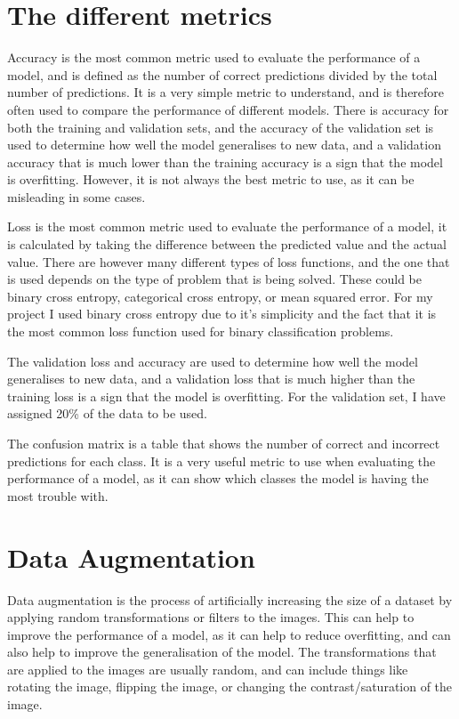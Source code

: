 \documentclass[]{final_report}
\begin{document}
\section{The different metrics}
Accuracy is the most common metric used to evaluate the performance of a model, and is defined as the number of correct predictions divided by the total number of predictions.
It is a very simple metric to understand, and is therefore often used to compare the performance of different models.
There is accuracy for both the training and validation sets, and the accuracy of the validation set is used to determine how well the model generalises to new data,
and a validation accuracy that is much lower than the training accuracy is a sign that the model is overfitting.
However, it is not always the best metric to use, as it can be misleading in some cases.

Loss is the most common metric used to evaluate the performance of a model, it is calculated by taking the difference between the predicted value and the actual value.
There are however many different types of loss functions, and the one that is used depends on the type of problem that is being solved.
These could be binary cross entropy, categorical cross entropy, or mean squared error. For my project I used binary cross entropy due
to it's simplicity and the fact that it is the most common loss function used for binary classification problems.

The validation loss and accuracy are used to determine how well the model generalises to new data, and a validation loss that is much higher than the training loss is a sign that the model is overfitting.
For the validation set, I have assigned 20\% of the data to be used.

The confusion matrix is a table that shows the number of correct and incorrect predictions for each class.
It is a very useful metric to use when evaluating the performance of a model, as it can show which classes the model is having the most trouble with.

\section{Data Augmentation}

Data augmentation is the process of artificially increasing the size of a dataset by applying random transformations or filters to the images.
This can help to improve the performance of a model, as it can help to reduce overfitting, and can also help to improve the generalisation of the model.
The transformations that are applied to the images are usually random, and can include things like rotating the image, 
flipping the image, or changing the contrast/saturation of the image.
\end{document}

